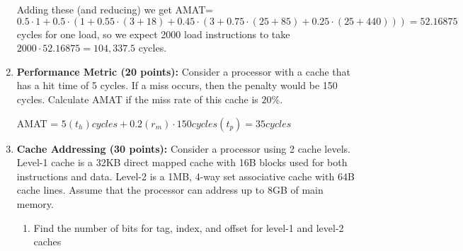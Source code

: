 \documentclass[a4paper, 11pt]{exam}
\begin{document}
\begin{enumerate}
Adding these (and reducing) we get AMAT=$0.5\cdot 1 + 0.5\cdot(1+0.55\cdot(3+18)+0.45\cdot(3+0.75\cdot(25+85)+0.25\cdot(25+440)))=52.16875$ cycles for one load, so we expect 2000 load instructions to take $2000\cdot52.16875=104,337.5$ cycles.

 
\item \textbf{Performance Metric (20 points): } Consider a processor with a cache that has a hit time
of 5 cycles. If a miss occurs, then the penalty would be 150 cycles. Calculate AMAT if the
miss rate of this cache is $20\%$.\newline

AMAT = $5(t_h)cycles + 0.2(r_m)\cdot150cycles(t_p) = 35cycles$

\item \textbf {Cache Addressing (30 points): }  Consider a processor using 2 cache levels. Level-1 cache is a
32KB direct mapped cache with 16B blocks used for both instructions and data. Level-2 is a
1MB, 4-way set associative cache with 64B cache lines. Assume that the processor can
address up to 8GB of main memory. 


 \begin{enumerate} [label=(\alph*)]
 \item  Find the number of bits for tag, index, and offset for level-1 and level-2 caches


\end{enumerate}
\end{enumerate}
\end{document}
